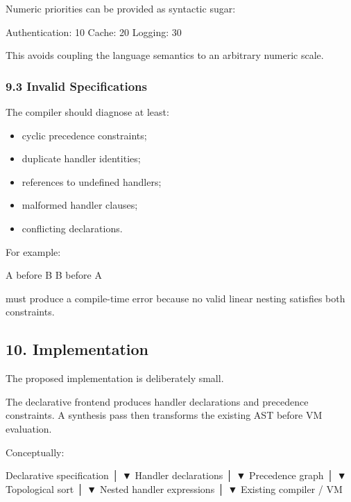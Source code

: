 \documentclass[
  11pt,
]{article}
\newenvironment{Shaded}{}{}
\newcommand{\NormalTok}[1]{#1}
\providecommand{\tightlist}{%
  \setlength{\itemsep}{0pt}\setlength{\parskip}{0pt}}
\begin{document}
Numeric priorities can be provided as syntactic sugar:

\begin{Shaded}
\begin{Highlighting}[]
\NormalTok{Authentication: 10}
\NormalTok{Cache: 20}
\NormalTok{Logging: 30}
\end{Highlighting}
\end{Shaded}

This avoids coupling the language semantics to an arbitrary numeric
scale.

\subsubsection{9.3 Invalid Specifications}\label{invalid-specifications}

The compiler should diagnose at least:

\begin{itemize}
\tightlist
\item
  cyclic precedence constraints;
\item
  duplicate handler identities;
\item
  references to undefined handlers;
\item
  malformed handler clauses;
\item
  conflicting declarations.
\end{itemize}

For example:

\begin{Shaded}
\begin{Highlighting}[]
\NormalTok{A before B}
\NormalTok{B before A}
\end{Highlighting}
\end{Shaded}

must produce a compile-time error because no valid linear nesting
satisfies both constraints.

\subsection{10. Implementation}\label{implementation}

The proposed implementation is deliberately small.

The declarative frontend produces handler declarations and precedence
constraints. A synthesis pass then transforms the existing AST before VM
evaluation.

Conceptually:

\begin{Shaded}
\begin{Highlighting}[]
\NormalTok{Declarative specification}
\NormalTok{          │}
\NormalTok{          ▼}
\NormalTok{ Handler declarations}
\NormalTok{          │}
\NormalTok{          ▼}
\NormalTok{ Precedence graph}
\NormalTok{          │}
\NormalTok{          ▼}
\NormalTok{ Topological sort}
\NormalTok{          │}
\NormalTok{          ▼}
\NormalTok{ Nested handler expressions}
\NormalTok{          │}
\NormalTok{          ▼}
\NormalTok{ Existing compiler / VM}
\end{Highlighting}
\end{Shaded}
\end{document}
